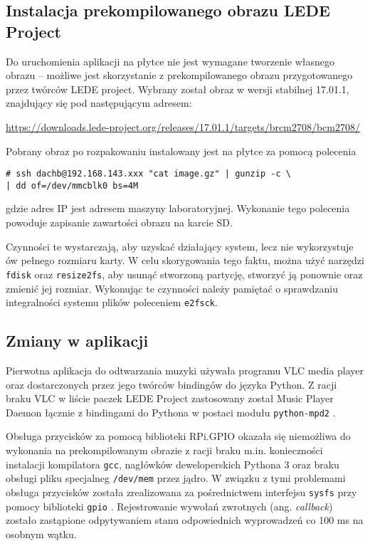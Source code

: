 \documentclass[10pt,a4paper]{article}
\begin{document}
\subsection{Instalacja prekompilowanego obrazu LEDE Project}

Do uruchomienia aplikacji na płytce nie jest wymagane tworzenie własnego obrazu -- możliwe jest
skorzystanie z prekompilowanego obrazu przygotowanego przez twórców LEDE project. Wybrany został
obraz w wersji stabilnej 17.01.1, znajdujący się pod następującym adresem:

\url{https://downloads.lede-project.org/releases/17.01.1/targets/brcm2708/bcm2708/}

Pobrany obraz po rozpakowaniu instalowany jest na płytce za pomocą polecenia

\begin{lstlisting}
# ssh dachb@192.168.143.xxx "cat image.gz" | gunzip -c \
| dd of=/dev/mmcblk0 bs=4M
\end{lstlisting}

gdzie adres IP jest adresem maszyny laboratoryjnej. Wykonanie tego polecenia powoduje zapisanie
zawartości obrazu na karcie SD.

Czynności te wystarczają, aby uzyskać działający system, lecz nie wykorzystuje ów pełnego rozmiaru
karty. W celu skorygowania tego faktu, można użyć narzędzi \texttt{fdisk} oraz \texttt{resize2fs},
aby usunąć stworzoną partycję, stworzyć ją ponownie oraz zmienić jej rozmiar. Wykonując te czynności
należy pamiętać o sprawdzaniu integralności systemu plików poleceniem \texttt{e2fsck}.

\subsection{Zmiany w aplikacji}

Pierwotna aplikacja do odtwarzania muzyki używała programu VLC media player oraz dostarczonych
przez jego twórców bindingów do języka Python. Z racji braku VLC w liście paczek LEDE Project
zastosowany został Music Player Daemon \cite{mpd} łącznie z bindingami do Pythona w postaci
modułu \texttt{python-mpd2} \cite{python-mpd2}.

Obsługa przycisków za pomocą biblioteki RPi.GPIO okazała się niemożliwa do wykonania
na prekompilowanym obrazie z racji braku m.in. konieczności instalacji
kompilatora \texttt{gcc}, nagłówków deweloperskich Pythona 3 oraz braku obsługi pliku specjalneg
\texttt{/dev/mem} przez jądro. W związku z tymi problemami obsługa przycisków została zrealizowana
za pośrednictwem interfejsu \texttt{sysfs} przy pomocy biblioteki \texttt{gpio} \cite{gpio}.
Rejestrowanie wywołań zwrotnych (ang. \emph{callback}) zostało zastąpione odpytywaniem stanu
odpowiednich wyprowadzeń co 100 ms na osobnym wątku.
\end{document}
